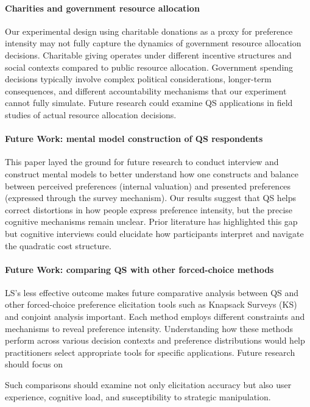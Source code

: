 \paragraph{Charities and government resource allocation}
Our experimental design using charitable donations as a proxy for preference intensity may not fully capture the dynamics of government resource allocation decisions. Charitable giving operates under different incentive structures and social contexts compared to public resource allocation. Government spending decisions typically involve complex political considerations, longer-term consequences, and different accountability mechanisms that our experiment cannot fully simulate. Future research could examine QS applications in field studies of actual resource allocation decisions.

\paragraph{Future Work: mental model construction of QS respondents}
This paper layed the ground for future research to conduct interview and construct mental models to better understand how one constructs and balance between perceived preferences (internal valuation) and presented preferences (expressed through the survey mechanism). Our results suggest that QS helps correct distortions in how people express preference intensity, but the precise cognitive mechanisms remain unclear. Prior literature has highlighted this gap but cognitive interviews could elucidate how participants interpret and navigate the quadratic cost structure.

\paragraph{Future Work: comparing QS with other forced-choice methods}
LS's less effective outcome makes future comparative analysis between QS and other forced-choice preference elicitation tools such as Knapsack Surveys (KS) and conjoint analysis important. Each method employs different constraints and mechanisms to reveal preference intensity. Understanding how these methods perform across various decision contexts and preference distributions would help practitioners select appropriate tools for specific applications. Future research should focus on 

Such comparisons should examine not only elicitation accuracy but also user experience, cognitive load, and susceptibility to strategic manipulation.
